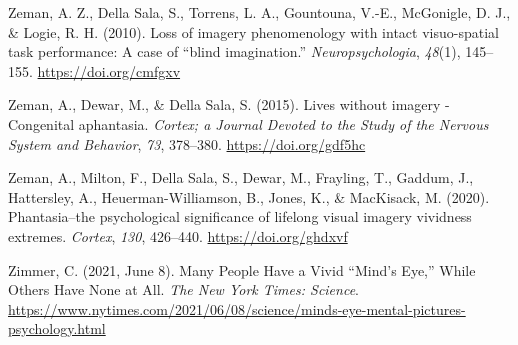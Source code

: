 \documentclass[
  oneside,
  12pt]{crumpbook}
\newlength{\cslhangindent}
\newlength{\cslentryspacingunit} %
\newenvironment{CSLReferences}[2] %
 {%
  \setlength{\parindent}{0pt}
  \ifodd #1
  \let\oldpar\par
  \def\par{\hangindent=\cslhangindent\oldpar}
  \fi
  \setlength{\parskip}{#2\cslentryspacingunit}
 }%
 {}
\begin{document}
\begin{CSLReferences}{1}{0}
\leavevmode{}%
Zeman, A. Z., Della Sala, S., Torrens, L. A., Gountouna, V.-E., McGonigle, D. J., \& Logie, R. H. (2010). Loss of imagery phenomenology with intact visuo-spatial task performance: {A} case of {``blind imagination.''} \emph{Neuropsychologia}, \emph{48}(1), 145--155. \url{https://doi.org/cmfgxv}

\leavevmode{}%
Zeman, A., Dewar, M., \& Della Sala, S. (2015). Lives without imagery - {Congenital} aphantasia. \emph{Cortex; a Journal Devoted to the Study of the Nervous System and Behavior}, \emph{73}, 378--380. \url{https://doi.org/gdf5hc}

\leavevmode{}%
Zeman, A., Milton, F., Della Sala, S., Dewar, M., Frayling, T., Gaddum, J., Hattersley, A., Heuerman-Williamson, B., Jones, K., \& MacKisack, M. (2020). Phantasia--the psychological significance of lifelong visual imagery vividness extremes. \emph{Cortex}, \emph{130}, 426--440. \url{https://doi.org/ghdxvf}

\leavevmode{}%
Zimmer, C. (2021, June 8). Many {People Have} a {Vivid} {``{Mind}'s {Eye},''} {While Others Have None} at {All}. \emph{The New York Times: Science}. \url{https://www.nytimes.com/2021/06/08/science/minds-eye-mental-pictures-psychology.html}

\end{CSLReferences}
\end{document}
